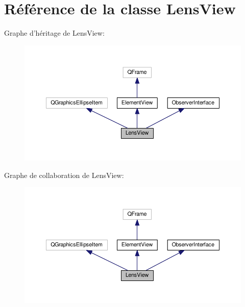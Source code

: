 \hypertarget{classLensView}{\section{Référence de la classe Lens\+View}
\label{classLensView}
}


Graphe d'héritage de Lens\+View\+:
\nopagebreak
\begin{figure}[H]
\begin{center}
\leavevmode
\includegraphics[width=350pt]{d3/d0e/classLensView__inherit__graph}
\end{center}
\end{figure}


Graphe de collaboration de Lens\+View\+:
\nopagebreak
\begin{figure}[H]
\begin{center}
\leavevmode
\includegraphics[width=350pt]{d3/d32/classLensView__coll__graph}
\end{center}
\end{figure}
